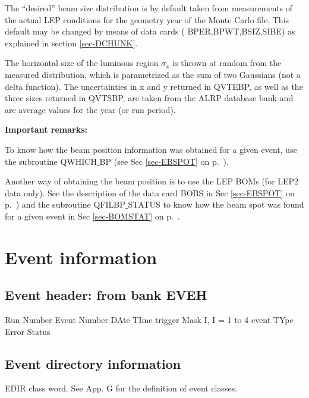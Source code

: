 \begin{indentlist}{ 2.50cm}{ 2.75cm}
 The ``desired'' beam size distribution is by default taken from
measurements of the actual LEP conditions for the geometry year of the
Monte Carlo file.  This default may be changed by means of data cards ( BPER,BPWT,BSIZ,SIBE) as
explained in section \ref{sec-DCHUNK}.
 
The horizontal size of the luminous region
$\sigma_x$  is thrown at random from the measured distribution, which is
parametrized as the sum of two Gaussians (not a delta function).  The
uncertainties in x and y returned in QVTEBP, as well as the three sizes
returned in QVTSBP, are taken from the ALRP database bank and are average
values for the year (or run period).
\end{indentlist}


{\bf Important remarks:}

To know how the beam position information was obtained for a given event, use the
subroutine QWHICH$\_$BP (see Sec \ref{sec-EBSPOT} on p.~\pageref{sec-EBSPOT}).

Another way of obtaining the beam position is to use the LEP BOMs (for LEP2 data only). See
the description of the data card BOBS in Sec \ref{sec-EBSPOT} on p.~\pageref{sec-EBSPOT})
and the subroutine QFILBP$\_$STATUS to know how the beam spot was found for a given event in
Sec \ref{sec-BOMSTAT} on p.~\pageref{sec-BOMSTAT}.
 
\section{\label{sec-MH}Event information}
\par
\subsection{\label{sec-MHE}Event header: from bank EVEH}
\par
\begin{indentlist}{ 2.50cm}{ 2.75cm}
Run Number
Event Number 
DAte
TIme
trigger Mask I, I = 1 to 4
event TYpe
Error Status
\end{indentlist}
\subsection{\label{sec-MED}Event directory information}
\par
\begin{indentlist}{ 2.50cm}{ 2.75cm}
EDIR class word.
                          See App. G for the definition of event classes.

\end{indentlist}
